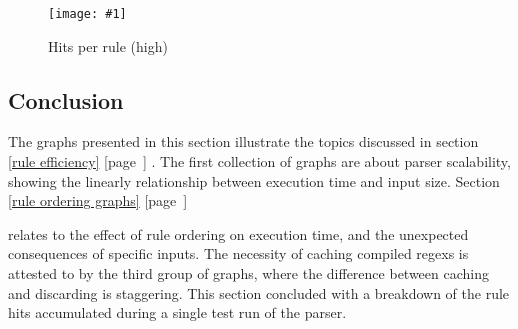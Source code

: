 \documentclass[a4paper,12pt,draft]{article}
\newcommand{\showgraph}[3]{
    \begin{figure}[hbt!]
        \caption{#2}\label{#3}
        \texttt{[image: \#1]}
    \end{figure}
}
\newcommand{\refwithpage}[1]{%
    \empty{}\ref{#1} [page~\pageref{#1}]%
}
\begin{document}
\showgraph{build/plot-hits-high.ps}{Hits per rule (high)}{hits per rule
high}

\clearpage

\subsection{Conclusion}

The graphs presented in this section illustrate the topics discussed in
section~\refwithpage{rule efficiency}.  The first collection of graphs are
about parser scalability, showing the linearly relationship between
execution time and input size.  Section~\refwithpage{rule ordering graphs}
relates to the effect of rule ordering on execution time, and the
unexpected consequences of specific inputs.  The necessity of caching
compiled regexs is attested to by the third group of graphs, where the
difference between caching and discarding is staggering.  This section
concluded with a breakdown of the rule hits accumulated during a single
test run of the parser.


\renewcommand{\glossarytitle}{\section{Glossary}\label{Glossary}}
\printglossary{}
\renewcommand{\glossarytitle}{\section{Acronyms}\label{Acronyms}}
\printacronym{}


\end{document}
